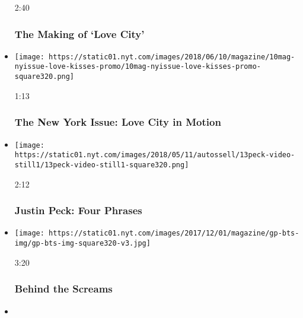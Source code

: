 \begin{itemize}
  2:40

  \hypertarget{the-making-of-love-city}{%
  \subsubsection{The Making of `Love
  City'}\label{the-making-of-love-city}}
\item
  \href{https://www.nytimes.com/video/magazine/100000005939489/the-new-york-issue-love-city-in-motion.html?action=click\&module=video-series-bar\&region=header\&pgtype=Article\&playlistId=video/magazine}{}

  \texttt{[image: https://static01.nyt.com/images/2018/06/10/magazine/10mag-nyissue-love-kisses-promo/10mag-nyissue-love-kisses-promo-square320.png]}

  1:13

  \hypertarget{the-new-york-issue-love-city-in-motion}{%
  \subsubsection{The New York Issue: Love City in
  Motion}\label{the-new-york-issue-love-city-in-motion}}
\item
  \href{https://www.nytimes.com/video/magazine/100000005893670/four-phrases-justin-peck-ballet-improvisations.html?action=click\&module=video-series-bar\&region=header\&pgtype=Article\&playlistId=video/magazine}{}

  \texttt{[image: https://static01.nyt.com/images/2018/05/11/autossell/13peck-video-still1/13peck-video-still1-square320.png]}

  2:12

  \hypertarget{justin-peck-four-phrases}{%
  \subsubsection{Justin Peck: Four
  Phrases}\label{justin-peck-four-phrases}}
\item
  \href{https://www.nytimes.com/video/magazine/100000005593268/behind-the-screams.html?action=click\&module=video-series-bar\&region=header\&pgtype=Article\&playlistId=video/magazine}{}

  \texttt{[image: https://static01.nyt.com/images/2017/12/01/magazine/gp-bts-img/gp-bts-img-square320-v3.jpg]}

  3:20

  \hypertarget{behind-the-screams}{%
  \subsubsection{Behind the Screams}\label{behind-the-screams}}
\item
  \href{https://www.nytimes.com/video/magazine/100000005588849/andy-serkis-the-demented-clown.html?action=click\&module=video-series-bar\&region=header\&pgtype=Article\&playlistId=video/magazine}{}


\end{itemize}
